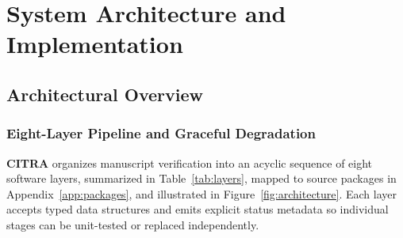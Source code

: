 \chapter{System Architecture and Implementation}
\label{chap:architecture}

\section{Architectural Overview}

\subsection{Eight-Layer Pipeline and Graceful Degradation}

\textbf{CITRA} organizes manuscript verification into an acyclic sequence of eight software layers, summarized in Table~\ref{tab:layers}, mapped to source packages in Appendix~\ref{app:packages}, and illustrated in Figure~\ref{fig:architecture}. Each layer accepts typed data structures and emits explicit status metadata so individual stages can be unit-tested or replaced independently.

